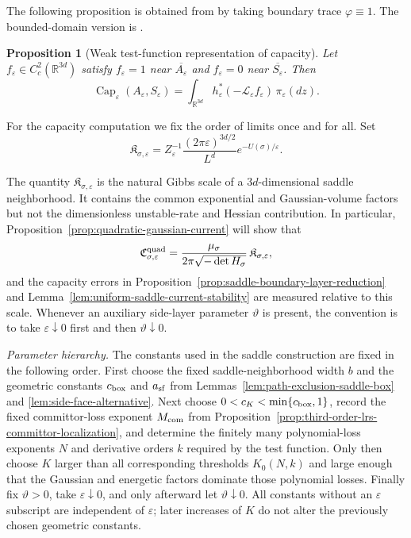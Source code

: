 \documentclass[11pt]{article}
\numberwithin{equation}{section}
\theoremstyle{plain}
\newtheorem{proposition}[theorem]{Proposition}
\theoremstyle{definition}
\theoremstyle{remark}
\newcommand{\R}{\mathbb R}
\newcommand{\eps}{\varepsilon}
\renewcommand{\Cap}{\operatorname{Cap}}
\newcommand{\calL}{\mathcal L}
\begin{document}
The following proposition is obtained from
\cite[Proposition~2.49]
{HeLiWangZhu2026WeakEquilibrium} by taking boundary trace
$\varphi\equiv1$.  The bounded-domain version is
\cite[Theorem~2.41]
{HeLiWangZhu2026WeakEquilibrium}.

\begin{proposition}[Weak test-function representation of capacity]
\label{prop:weak-test-function-capacity}
Let $f_\eps\in C_c^2(\R^{3d})$ satisfy $f_\eps=1$ near
$\overline{A_\eps}$ and $f_\eps=0$ near $\overline{S_\eps}$.  Then
\[
\Cap_\eps(A_\eps,S_\eps)
=\int_{\R^{3d}}h_\eps^*(-\calL_\eps f_\eps)\,\pi_\eps(dz).
\]
\end{proposition}

For the capacity computation we fix the order of limits once and for all.  Set
\begin{equation}
\label{eq:Ksigma-def}
\mathfrak K_{\sigma,\eps}
=
Z_\eps^{-1}\frac{(2\pi\eps)^{3d/2}}{L^d}e^{-U(\sigma)/\eps}.
\end{equation}

The quantity $\mathfrak K_{\sigma,\eps}$ is the natural Gibbs scale of a
$3d$-dimensional saddle neighborhood.  It contains the common exponential
and Gaussian-volume factors but not the dimensionless unstable-rate and
Hessian contribution.  In particular, Proposition~\ref{prop:quadratic-gaussian-current}
will show that
\[
\mathfrak C_{\sigma,\eps}^{\rm quad}
=\frac{\mu_\sigma}{2\pi\sqrt{-\det H_\sigma}}\,
\mathfrak K_{\sigma,\eps},
\]
and the capacity errors in
Proposition~\ref{prop:saddle-boundary-layer-reduction} and
Lemma~\ref{lem:uniform-saddle-current-stability} are measured relative to
this scale.  Whenever
an auxiliary side-layer parameter $\vartheta$ is present, the convention is to
take $\eps\downarrow0$ first and then $\vartheta\downarrow0$.

\emph{Parameter hierarchy.}
The constants used in the saddle construction are fixed in the following
order.  First choose the fixed saddle-neighborhood width $b$ and the geometric
constants $c_{\rm box}$ and $a_{\rm sf}$ from
Lemmas~\ref{lem:path-exclusion-saddle-box} and
\ref{lem:side-face-alternative}.  Next choose
$0<c_K<\min\{c_{\rm box},1\}$, record the fixed committor-loss exponent
$M_{\rm com}$ from
Proposition~\ref{prop:third-order-lrs-committor-localization}, and determine
the finitely many polynomial-loss exponents $N$ and derivative orders $k$
required by the test function.  Only then choose $K$ larger than all
corresponding thresholds $K_0(N,k)$ and large enough that the Gaussian and
energetic factors dominate those polynomial losses.  Finally fix
$\vartheta>0$, take $\eps\downarrow0$, and only afterward let
$\vartheta\downarrow0$.  All constants without an $\eps$ subscript are
independent of $\eps$; later increases of $K$ do not alter the previously
chosen geometric constants.
\end{document}
